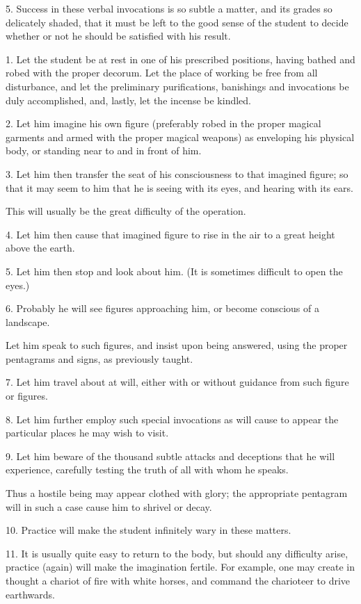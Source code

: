 5. Success in these verbal invocations is so subtle a matter, and its grades so delicately shaded, that it must be left to the good sense of the student to decide whether or not he should be satisfied with his result.



1. Let the student be at rest in one of his prescribed positions, having bathed and robed with the proper decorum. Let the place of working be free from all disturbance, and let the preliminary purifications, banishings and invocations be duly accomplished, and, lastly, let the incense be kindled.

2. Let him imagine his own figure (preferably robed in the proper magical garments and armed with the proper magical weapons) as enveloping his physical body, or standing near to and in front of him.

3. Let him then transfer the seat of his consciousness to that imagined figure; so that it may seem to him that he is seeing with its eyes, and hearing with its ears.

This will usually be the great difficulty of the operation.

4. Let him then cause that imagined figure to rise in the air to a great height above the earth.

5. Let him then stop and look about him. (It is sometimes difficult to open the eyes.)

6. Probably he will see figures approaching him, or become conscious of a landscape.

Let him speak to such figures, and insist upon being answered, using the proper pentagrams and signs, as previously taught.

7. Let him travel about at will, either with or without guidance from such figure or figures.

8. Let him further employ such special invocations as will cause to appear the particular places he may wish to visit.

9. Let him beware of the thousand subtle attacks and deceptions that he will experience, carefully testing the truth of all with whom he speaks.

Thus a hostile being may appear clothed with glory; the appropriate pentagram will in such a case cause him to shrivel or decay.

10. Practice will make the student infinitely wary in these matters.

11. It is usually quite easy to return to the body, but should any difficulty arise, practice (again) will make the imagination fertile. For example, one may create in thought a chariot of fire with white horses, and command the charioteer to drive earthwards.

